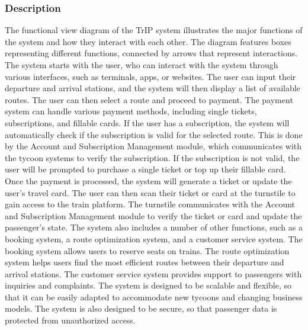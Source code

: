 \subsubsection{Description}
The functional view diagram of the TrIP system illustrates the major functions of the system and how they interact with each other. The diagram features boxes representing different functions, connected by arrows that represent interactions.
The system starts with the user, who can interact with the system through various interfaces, such as terminals, apps, or websites. The user can input their departure and arrival stations, and the system will then display a list of available routes. The user can then select a route and proceed to payment.
The payment system can handle various payment methods, including single tickets, subscriptions, and fillable cards. If the user has a subscription, the system will automatically check if the subscription is valid for the selected route. This is done by the Account and Subscription Management module, which communicates with the tycoon systems to verify the subscription. If the subscription is not valid, the user will be prompted to purchase a single ticket or top up their fillable card.
Once the payment is processed, the system will generate a ticket or update the user's travel card. The user can then scan their ticket or card at the turnstile to gain access to the train platform. The turnstile communicates with the Account and Subscription Management module to verify the ticket or card and update the passenger's state.
The system also includes a number of other functions, such as a booking system, a route optimization system, and a customer service system. The booking system allows users to reserve seats on trains. The route optimization system helps users find the most efficient routes between their departure and arrival stations. The customer service system provides support to passengers with inquiries and complaints.
The system is designed to be scalable and flexible, so that it can be easily adapted to accommodate new tycoons and changing business models. The system is also designed to be secure, so that passenger data is protected from unauthorized access.

